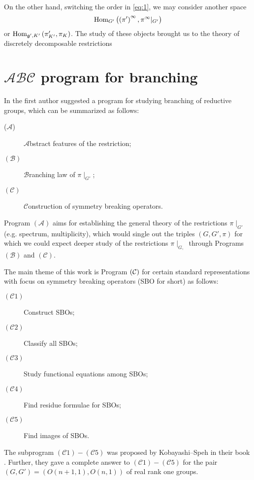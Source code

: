 \documentclass[reqno,12pt]{pja00} %
\newcommand{\Hom}{\mbox{\normalfont Hom}}
\theoremstyle{definition}
\theoremstyle{exampstyle} \newtheorem{examp}[theorem]{Theorem}
\begin{document}
On the other hand, switching the order in \eqref{eq:1}, we may consider another space
\begin{equation*}
	\Hom_{G'}\left( \left( \pi' \right)^\infty,\pi^\infty\kern-0.1cm\mid_{G'} \right)
\end{equation*}
or $\Hom_{\mathfrak{g}',K'}\left( \pi_{K'}',\pi_{K} \right)$.
The study of these objects brought us to the theory of discretely decomposable restrictions \cite{kobayashi1998discrete2,kobayashi1998discrete3}

\section{$\mathcal{A}\mathcal{B}\mathcal{C}$ program for branching}

In {\cite{kobayashi2015program}} the first author suggested a program
for studying branching of reductive groups, which can be summarized
as follows:
\begin{description}
  \item[($\mathcal{A}$)] $\mathcal{A}$bstract features of the restriction;
  
  \item[$(\mathcal{B})$] $\mathcal{B}$ranching law of $\pi\!\mid_{G'}$;
  
  \item[$(\mathcal{C})$] $\mathcal{C}$onstruction of symmetry breaking operators.
\end{description}
Program $\left( \mathcal{A} \right)$ aims for establishing the general theory of the restrictions $\pi\!\mid_{G'}$
(e.g. spectrum, multiplicity), which would single out the triples $\left( G,G',\pi \right)$ for which we could expect deeper study of the restrictions
$\pi\!\mid_{G,}$ through Programs $\left( \mathcal{B} \right)$ and $\left( \mathcal{C} \right)$.

The main theme of this work is Program $\left(\mathcal{C}\right)$ for certain standard
representations with focus on symmetry breaking operators (SBO for short) as follows:
\begin{description}
  \item[$(\mathcal{C}1)$] Construct SBOs;
  
  \item[$(\mathcal{C}2)$] Classify all SBOs;
  
  \item[$(\mathcal{C}3)$] Study functional equations among SBOs;
  
  \item[$(\mathcal{C}4)$] Find residue formulae for SBOs;
  
  \item[$(\mathcal{C}5)$] Find images of SBOs.
\end{description}
The subprogram $(\mathcal{C}1) - (\mathcal{C}5)$ was proposed by
Kobayashi--Speh in their book {\cite{kobayashi2015symmetry}}. Further, they
gave a complete answer to $(\mathcal{C}1) - (\mathcal{C}5)$ for the
pair $(G, G') = (O (n + 1, 1), O (n, 1))$ of real rank one groups.
\end{document}
